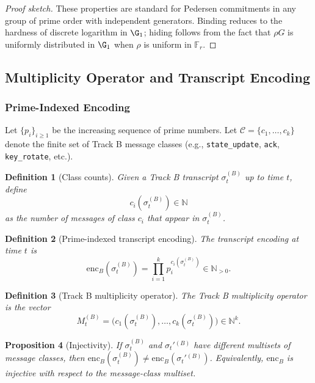 \documentclass[11pt]{article}
\newtheorem{definition}{Definition}[section]
\newtheorem{proposition}[definition]{Proposition}
\newcommand{\N}{\mathbb{N}}
\newcommand{\F}{\mathbb{F}}
\begin{document}
\begin{proof}[Proof sketch]
These properties are standard for Pedersen commitments in any group of prime order with independent generators.\cite{PedersenZKDocs,PedersenRareSkills,PedersenLibby,PedersenLibbitcoin}
Binding reduces to the hardness of discrete logarithm in \(\G_1\); hiding follows from the fact that \(\rho G\) is uniformly distributed in \(\G_1\) when \(\rho\) is uniform in \(\F_r\).
\end{proof}

\subsection{Multiplicity Operator and Transcript Encoding}

\subsubsection{Prime-Indexed Encoding}

Let \(\{p_i\}_{i \ge 1}\) be the increasing sequence of prime numbers.
Let \(\mathcal{C} = \{c_1,\dots,c_k\}\) denote the finite set of Track B message classes (e.g., \texttt{state\_update}, \texttt{ack}, \texttt{key\_rotate}, etc.).

\begin{definition}[Class counts]
Given a Track B transcript \(\sigma_t^{(B)}\) up to time \(t\), define
\[
  c_i(\sigma_t^{(B)}) \in \N
\]
as the number of messages of class \(c_i\) that appear in \(\sigma_t^{(B)}\).
\end{definition}

\begin{definition}[Prime-indexed transcript encoding]
The transcript encoding at time \(t\) is
\[
  \mathrm{enc}_B(\sigma_t^{(B)}) = \prod_{i=1}^k p_i^{c_i(\sigma_t^{(B)})} \in \N_{>0}.
\]
\end{definition}

\begin{definition}[Track B multiplicity operator]
The Track B multiplicity operator is the vector
\[
  M_t^{(B)} = \bigl(c_1(\sigma_t^{(B)}), \dots, c_k(\sigma_t^{(B)})\bigr) \in \N^k.
\]
\end{definition}

\begin{proposition}[Injectivity]
If \(\sigma_t^{(B)}\) and \(\sigma_t'{}^{(B)}\) have different multisets of message classes, then
\(\mathrm{enc}_B(\sigma_t^{(B)}) \ne \mathrm{enc}_B(\sigma_t'{}^{(B)})\).
Equivalently, \(\mathrm{enc}_B\) is injective with respect to the message-class multiset.
\end{proposition}
\end{document}

